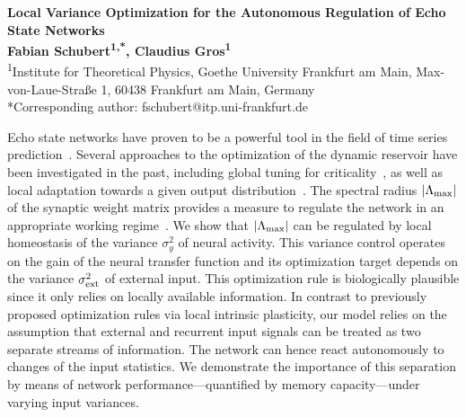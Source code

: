 \documentclass[a4paper,fontsize=12pt]{scrartcl}
\begin{document}
\pagestyle{empty}
\begin{spacing}{1.11}
\begin{center}
  \changefontsizes{20pt}\textbf{Local Variance Optimization for the Autonomous Regulation of Echo State Networks} \\
  \vspace{.74cm}
  \changefontsizes{12pt}\textbf{Fabian Schubert\textsuperscript{1,*}, Claudius Gros\textsuperscript{1}} \\
  \vspace{.44cm}
  \changefontsizes{10pt}\textsuperscript{1}Institute for Theoretical Physics, Goethe University Frankfurt am Main, Max-von-Laue-Straße 1, 60438 Frankfurt am Main, Germany \\
  *Corresponding author: fschubert@itp.uni-frankfurt.de
\end{center}
\vspace{-.08cm}

Echo state networks have proven to be a powerful tool in the field of time series prediction~\citep{Jaeger_2001,Lukosevicius_2009}. Several approaches to the optimization of the dynamic reservoir have been investigated in the past, including global tuning for criticality~\cite{Livi_2016}, as well as local adaptation towards a given output distribution~\cite{Schrauwen_2008,Boedecker_2009}. The spectral radius $|\Lambda_{\rm max}|$ of the synaptic weight matrix provides a measure to regulate the network in an appropriate working regime~\cite{Caluwaerts_2013}. We show that $|\Lambda_{\rm max}|$ can be regulated by local homeostasis of the variance $\sigma_y^2$ of neural activity. This variance control operates on the gain of the neural transfer function and its optimization target depends on the variance $\sigma_{\rm ext}^2$ of external input. This optimization rule is biologically plausible since it only relies on locally available information. In contrast to previously proposed optimization rules via local intrinsic plasticity, our model relies on the assumption that external and recurrent input signals can be treated as two separate streams of information. The network can hence react autonomously to changes of the input statistics. We demonstrate the importance of this separation by means of network performance---quantified by memory capacity---under varying input variances.

\end{spacing}
\vspace{-.35cm}

\end{document}
